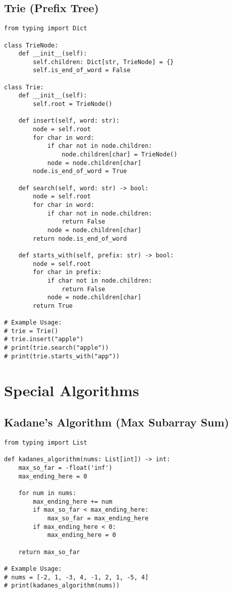\documentclass[11pt, a4paper]{article}
\begin{document}
\subsection{Trie (Prefix Tree)}
\begin{verbatim}
from typing import Dict

class TrieNode:
    def __init__(self):
        self.children: Dict[str, TrieNode] = {}
        self.is_end_of_word = False

class Trie:
    def __init__(self):
        self.root = TrieNode()

    def insert(self, word: str):
        node = self.root
        for char in word:
            if char not in node.children:
                node.children[char] = TrieNode()
            node = node.children[char]
        node.is_end_of_word = True

    def search(self, word: str) -> bool:
        node = self.root
        for char in word:
            if char not in node.children:
                return False
            node = node.children[char]
        return node.is_end_of_word

    def starts_with(self, prefix: str) -> bool:
        node = self.root
        for char in prefix:
            if char not in node.children:
                return False
            node = node.children[char]
        return True

# Example Usage:
# trie = Trie()
# trie.insert("apple")
# print(trie.search("apple"))
# print(trie.starts_with("app"))
\end{verbatim}

\section{Special Algorithms}

\subsection{Kadane's Algorithm (Max Subarray Sum)}
\begin{verbatim}
from typing import List

def kadanes_algorithm(nums: List[int]) -> int:
    max_so_far = -float('inf')
    max_ending_here = 0
    
    for num in nums:
        max_ending_here += num
        if max_so_far < max_ending_here:
            max_so_far = max_ending_here
        if max_ending_here < 0:
            max_ending_here = 0
            
    return max_so_far

# Example Usage:
# nums = [-2, 1, -3, 4, -1, 2, 1, -5, 4]
# print(kadanes_algorithm(nums))
\end{verbatim}
\end{document}
